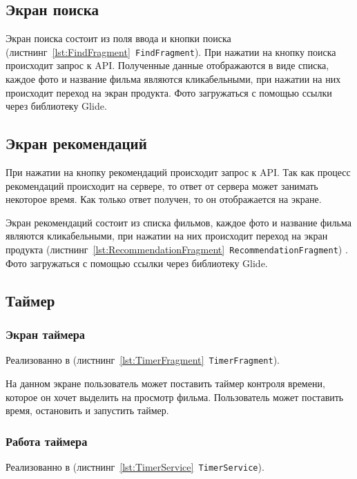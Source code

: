 \subsection{Экран поиска}

Экран поиска состоит из поля ввода и кнопки поиска (листнинг~\ref{lst:FindFragment}\texttt{ FindFragment}).
При нажатии на кнопку поиска происходит запрос к API.
Полученные данные отображаются в виде списка, каждое фото и название фильма являются кликабельными, при нажатии на них
происходит переход на экран продукта.
Фото загружаться с помощью ссылки через библиотеку Glide.


\subsection{Экран рекомендаций}

При нажатии на кнопку рекомендаций происходит запрос к API.
Так как процесс рекомендаций происходит на сервере, то ответ от сервера может занимать некоторое время.
Как только ответ получен, то он отображается на экране.

Экран рекомендаций состоит из списка фильмов, каждое фото и название фильма являются кликабельными, при нажатии на них
происходит переход на экран продукта (листнинг~\ref{lst:RecommendationFragment}\texttt{ RecommendationFragment}) .
Фото загружаться с помощью ссылки через библиотеку Glide.

\subsection{Таймер}

\subsubsection{Экран таймера}

Реализованно в (листнинг~\ref{lst:TimerFragment}\texttt{ TimerFragment}).

На данном экране пользователь может поставить таймер контроля времени,
которое он хочет выделить на просмотр фильма.
Пользователь может поставить время, остановить и запустить таймер.

\subsubsection{Работа таймера}

Реализованно в (листнинг~\ref{lst:TimerService}\texttt{ TimerService}).

